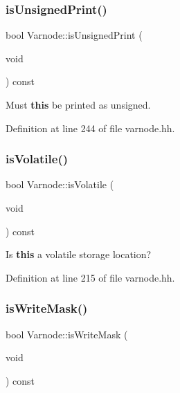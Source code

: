 \subsubsection{\texorpdfstring{isUnsignedPrint()}{isUnsignedPrint()}}
{\footnotesize\ttfamily bool Varnode\+::is\+Unsigned\+Print (\begin{DoxyParamCaption}\item[{void}]{ }\end{DoxyParamCaption}) const\hspace{0.3cm}{\ttfamily [inline]}}



Must {\bfseries{this}} be printed as unsigned. 



Definition at line 244 of file varnode.\+hh.

\mbox{\label{class_varnode_ac93bac59635c06a0cf7092de6eddf1ff}} 
\subsubsection{\texorpdfstring{isVolatile()}{isVolatile()}}
{\footnotesize\ttfamily bool Varnode\+::is\+Volatile (\begin{DoxyParamCaption}\item[{void}]{ }\end{DoxyParamCaption}) const\hspace{0.3cm}{\ttfamily [inline]}}



Is {\bfseries{this}} a volatile storage location? 



Definition at line 215 of file varnode.\+hh.

\mbox{\label{class_varnode_abc9895d5099784197952078f8be69a14}} 
\subsubsection{\texorpdfstring{isWriteMask()}{isWriteMask()}}
{\footnotesize\ttfamily bool Varnode\+::is\+Write\+Mask (\begin{DoxyParamCaption}\item[{void}]{ }\end{DoxyParamCaption}) const\hspace{0.3cm}{\ttfamily [inline]}}



